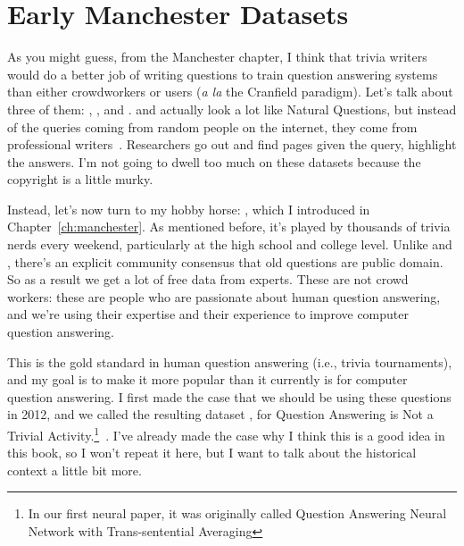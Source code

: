%
%

\section{Early Manchester Datasets}

As you might guess, from the Manchester chapter, I think that trivia
writers would do a better job of writing questions to train question
answering systems than either crowdworkers or users (\textit{a la} the
Cranfield paradigm).
%
Let’s talk about three of them: \searchqa{}, \triviaqa{}, and \qanta{}.
%
\searchqa{} and \triviaqa{} actually look a lot like Natural Questions, but
instead of the queries coming from random people on the internet, they
come from professional writers~\citep{dunn-17,joshi-17}.
%
Researchers go out and find pages given the query, highlight the
answers.
%
I’m not going to dwell too much on these datasets because the
copyright is a little murky.

Instead, let's now turn to my hobby horse: \quizbowl{}, which I
introduced in Chapter~\ref{ch:manchester}.
%
As mentioned before, it's played by thousands of trivia nerds every
weekend, particularly at the high school and college level.
%
Unlike \searchqa{} and \triviaqa{}, there’s an explicit community consensus
that old \quizbowl{} questions are public domain.
%
So as a result we get a lot of free data from experts. These are not
crowd workers: these are people who are passionate about human
question answering, and we're using their expertise and their
experience to improve computer question answering.

This is the gold standard in human question answering (i.e., trivia
tournaments), and my goal is to make it more popular than it currently
is for computer question answering.
%
I first made the case that we should be using these questions in 2012,
and we called the resulting dataset \qanta{}, for Question
Answering is Not a Trivial Activity.\footnote{In our first neural  paper, it
  was originally called Question Answering Neural Network with Trans-sentential Averaging
}~\citep{boyd-graber:claudino:socher:iii-2014}.
%
I've already made the case why I think this is a good idea in this
book, so I won't repeat it here, but I want to talk about the
historical context a little bit more.

